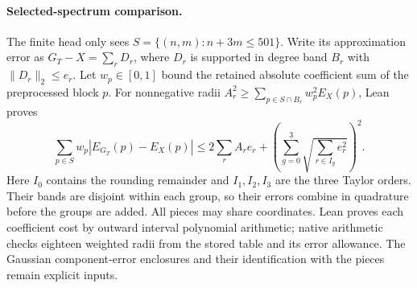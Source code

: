 \documentclass[11pt,a4paper]{article}
\begin{document}
\paragraph{Selected-spectrum comparison.}
The finite head only sees $S=\{(n,m):n+3m\le501\}$. Write its approximation error as
$G_T-X=\sum_r D_r$, where $D_r$ is supported in degree band $B_r$ with $\|D_r\|_2\le e_r$.
Let $w_p\in[0,1]$ bound the retained absolute coefficient sum of the preprocessed block $p$.
For nonnegative radii $A_r^2\ge\sum_{p\in S\cap B_r}w_p^2E_X(p)$, Lean proves
\[
 \sum_{p\in S}w_p|E_{G_T}(p)-E_X(p)|
 \le2\sum_r A_re_r+\left(\sum_{g=0}^3\sqrt{\sum_{r\in I_g}e_r^2}\right)^2.
\]
Here $I_0$ contains the rounding remainder and $I_1,I_2,I_3$ are the three Taylor orders.
Their bands are disjoint within each group, so their errors combine in quadrature before the groups are added.
All pieces may share coordinates. Lean proves each coefficient cost by outward interval polynomial arithmetic;
native arithmetic checks eighteen weighted radii from the stored table and its error allowance.
The Gaussian component-error enclosures and their identification with the pieces remain explicit inputs.
\end{document}

